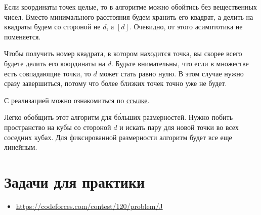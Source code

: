\begin{observation}
    Если координаты точек целые, то в алгоритме можно обойтись без вещественных чисел. Вместо минимального расстояния будем хранить его квадрат, а делить на квадраты будем со стороной не $d$, а $\left\lfloor d \right\rfloor$. Очевидно, от этого асимптотика не поменяется.
\end{observation}

\begin{observation}
    Чтобы получить номер квадрата, в котором находится точка, вы скорее всего будете делить его координаты на $d$. Будьте внимательны, что если в множестве есть совпадающие точки, то $d$ может стать равно нулю. В этом случае нужно сразу завершиться, потому что более близких точек точно уже не будет.
\end{observation}

С реализацией можно ознакомиться по \href{https://pastebin.com/zwSY4tHq}{ссылке}.

\begin{observation}
    Легко обобщить этот алгоритм для б\'{о}льших размерностей. Нужно побить пространство на кубы со стороной $d$ и искать пару для новой точки во всех соседних кубах. Для фиксированной размерности алгоритм будет все еще линейным.
\end{observation}


\section{Задачи для практики}

\begin{itemize}
    
    \item \href{https://codeforces.com/contest/120/problem/J}{https://codeforces.com/contest/120/problem/J}
\end{itemize}
